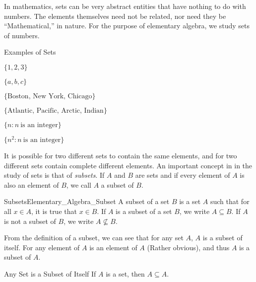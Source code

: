 \documentclass[crop=false,class=book,oneside]{standalone}
\begin{document}
            In mathematics, sets can be very abstract entities that
            have nothing to do with numbers. The elements
            themselves need not be related, nor need they be
            ``Mathematical,'' in nature. For the purpose of
            elementary algebra, we study sets of numbers.
            \begin{fexample}{Examples of Sets}{}
                \begin{enumerate}
                    \begin{multicols}{2}
                        \item $\{1,2,3\}$
                        \item $\{a,b,c\}$
                        \item $\{\textrm{Boston, New York, Chicago}\}$
                        \item $\{\textrm{Atlantic, Pacific, Arctic, Indian}\}$
                        \item $\{n:n\ \textrm{is an integer}\}$
                        \item $\{n^2: n\ \textrm{is an integer}\}$
                    \end{multicols}
                \end{enumerate}
            \end{fexample}
            It is possible for two different sets to contain the
            same elements, and for two different sets contain
            complete different elements. An important concept in
            in the study of sets is that of \textit{subsets}. If
            $A$ and $B$ are sets and if every element of $A$
            is also an element of $B$, we call $A$ a subset
            of $B$.
            \begin{fdefinition}{Subsets}{Elementary_Algebra_Subset}
                A subset of a set $B$ is a set $A$ such that for all
                $x\in{A}$, it is true that $x\in{B}$. If $A$ is a
                subset of a set $B$, we write
                $A\subseteq{B}$. If $A$ is not a subset of $B$,
                we write $A\not\subseteq{B}$.
            \end{fdefinition}
            From the definition of a subset, we can see that for
            any set $A$, $A$ is a subset of itself. For any element
            of $A$ is an element of $A$ (Rather obvious), and thus
            $A$ is a subset of $A$.
            \begin{ftheorem}{Any Set is a Subset of Itself}{}
                If $A$ is a set, then $A\subseteq{A}$.
            \end{ftheorem}
\end{document}
